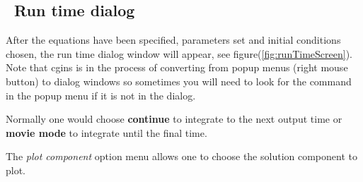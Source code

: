 \subsection{\Solver\ Run time dialog}\label{sec:runTimeDialog}

After the equations have been specified, parameters set and initial conditions chosen, 
the run time dialog window will appear, see figure(\ref{fig:runTimeScreen}).
Note that cgins is in the process of converting from popup menus (right mouse button) to
dialog windows so sometimes you will need to look for the command in the popup menu
if it is not in the dialog. 

Normally one would choose {\bf continue} to integrate to the next output time or {\bf movie mode}
to integrate until the final time.

\noindent The {\em plot component} option menu allows one to choose the solution
component to plot.


